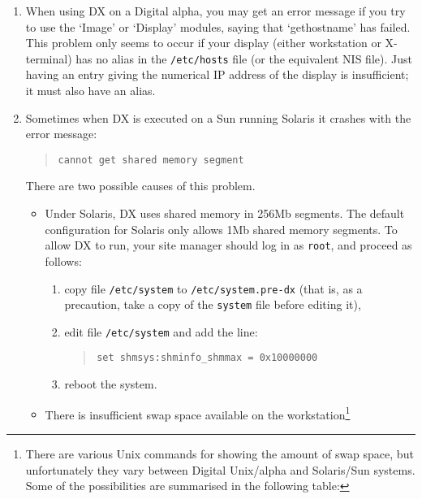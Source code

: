 \begin{enumerate}
  \item When using DX on a Digital alpha, you may get an error message if you
   try to use the `Image' or `Display' modules, saying that `gethostname'
   has failed. This problem only seems to occur if your display (either
   workstation or X-terminal) has no alias in the {\tt /etc/hosts} file
   (or the equivalent NIS file). Just having an entry giving the numerical
   IP address of the display is insufficient; it must also have an alias.

  \item Sometimes when DX is executed on a Sun running Solaris it crashes
   with the error message:

  \begin{quote}
   {\tt cannot get shared memory segment}
  \end{quote}

   There are two possible causes of this problem.

  \begin{itemize}

    \item Under Solaris, DX uses shared memory in 256Mb segments.
     The default configuration for Solaris only allows 1Mb shared
     memory segments.  To allow DX to run, your site manager should
     log in as {\tt root}, and proceed as follows:

    \begin{enumerate}

      \item copy file {\tt /etc/system} to {\tt /etc/system.pre-dx}
       (that is, as a precaution, take a copy of the {\tt system} file
       before editing it),

      \item edit file {\tt /etc/system} and add the line:
      \begin{quote}
       {\tt set shmsys:shminfo\_shmmax = 0x10000000}
      \end{quote}

      \item reboot the system.

    \end{enumerate}

    \pagebreak[4]
    \item There is insufficient swap space available on the
     workstation\footnote{There are various Unix commands for showing
     the amount of swap space, but unfortunately they vary between
     Digital Unix/alpha and Solaris/Sun systems. Some of the possibilities
     are summarised in the following table:

}
\end{itemize}
\end{enumerate}
